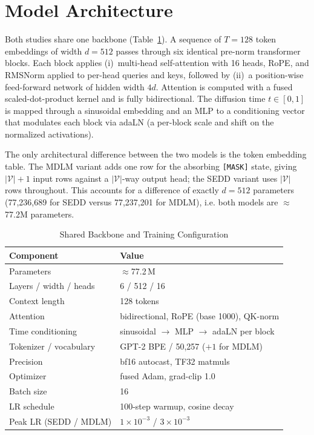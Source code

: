 \documentclass[conference]{IEEEtran}
\begin{document}
\section{Model Architecture}
Both studies share one backbone (Table~\ref{tab:arch}). A sequence of
$T{=}128$ token embeddings of width $d{=}512$ passes through six
identical pre-norm transformer blocks. Each block applies
(i)~multi-head self-attention with 16 heads, RoPE, and RMSNorm applied
to per-head queries and keys, followed by (ii)~a position-wise
feed-forward network of hidden width $4d$. Attention is computed with a
fused scaled-dot-product kernel and is fully bidirectional. The
diffusion time $t\in[0,1]$ is mapped through a sinusoidal embedding and
an MLP to a conditioning vector that modulates each block via adaLN
(a per-block scale and shift on the normalized activations).

The only architectural difference between the two models is the token
embedding table. The MDLM variant adds one row for the absorbing
\texttt{[MASK]} state, giving $|\mathcal{V}|{+}1$ input rows against a
$|\mathcal{V}|$-way output head; the SEDD variant uses
$|\mathcal{V}|$ rows throughout. This accounts for a difference of
exactly $d{=}512$ parameters (77{,}236{,}689 for SEDD versus
77{,}237{,}201 for MDLM), i.e. both models are $\approx$77.2M
parameters.

\begin{table}[t]
\caption{Shared Backbone and Training Configuration}
\label{tab:arch}
\centering
\begin{tabular}{@{}ll@{}}
\toprule
\textbf{Component} & \textbf{Value} \\
\midrule
Parameters & $\approx$77.2\,M \\
Layers / width / heads & 6 / 512 / 16 \\
Context length & 128 tokens \\
Attention & bidirectional, RoPE (base 1000), QK-norm \\
Time conditioning & sinusoidal $\to$ MLP $\to$ adaLN per block \\
Tokenizer / vocabulary & GPT-2 BPE / 50{,}257 ($+1$ for MDLM) \\
Precision & bf16 autocast, TF32 matmuls \\
Optimizer & fused Adam, grad-clip 1.0 \\
Batch size & 16 \\
LR schedule & 100-step warmup, cosine decay \\
Peak LR (SEDD / MDLM) & $1\times10^{-3}$ / $3\times10^{-3}$ \\
\bottomrule
\end{tabular}
\end{table}
\end{document}
